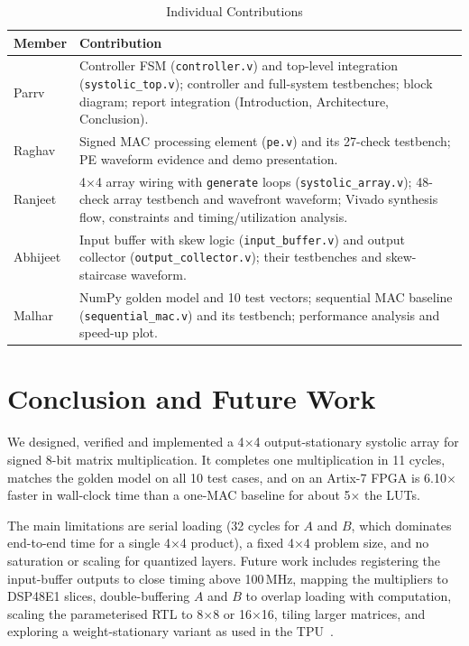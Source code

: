 \documentclass[conference]{IEEEtran}
\newcommand{\code}[1]{\texttt{#1}}
\begin{document}
\begin{table}[t]
  \centering
  \caption{Individual Contributions}
  \label{tab:contrib}
  \footnotesize
  \begin{tabular}{@{}l p{6.0cm}@{}}
    \toprule
    Member & Contribution \\
    \midrule
    Parrv & Controller FSM (\code{controller.v}) and top-level integration
            (\code{systolic\_top.v}); controller and full-system testbenches;
            block diagram; report integration (Introduction, Architecture,
            Conclusion). \\
    Raghav & Signed MAC processing element (\code{pe.v}) and its 27-check
             testbench; PE waveform evidence and demo presentation. \\
    Ranjeet & 4$\times$4 array wiring with \code{generate} loops
              (\code{systolic\_array.v}); 48-check array testbench and
              wavefront waveform; Vivado synthesis flow, constraints and
              timing/utilization analysis. \\
    Abhijeet & Input buffer with skew logic (\code{input\_buffer.v}) and
               output collector (\code{output\_collector.v}); their
               testbenches and skew-staircase waveform. \\
    Malhar & NumPy golden model and 10 test vectors; sequential MAC baseline
             (\code{sequential\_mac.v}) and its testbench; performance
             analysis and speed-up plot. \\
    \bottomrule
  \end{tabular}
\end{table}

\section{Conclusion and Future Work}
We designed, verified and implemented a 4$\times$4 output-stationary systolic
array for signed 8-bit matrix multiplication. It completes one multiplication
in 11 cycles, matches the golden model on all 10 test cases, and on an Artix-7
FPGA is 6.10$\times$ faster in wall-clock time than a one-MAC baseline for
about 5$\times$ the LUTs.

The main limitations are serial loading (32 cycles for $A$ and $B$, which
dominates end-to-end time for a single 4$\times$4 product), a fixed 4$\times$4
problem size, and no saturation or scaling for quantized layers. Future work
includes registering the input-buffer outputs to close timing above 100\,MHz,
mapping the multipliers to DSP48E1 slices, double-buffering $A$ and $B$ to
overlap loading with computation, scaling the parameterised RTL to 8$\times$8
or 16$\times$16, tiling larger matrices, and exploring a weight-stationary
variant as used in the TPU~\cite{jouppi2017}.
\end{document}
